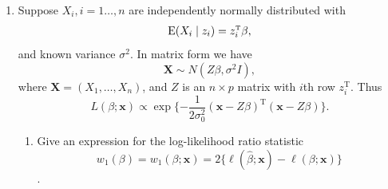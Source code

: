 \documentclass[12pt]{article}
\def\E{{\rm E}}
\def\T{{ \mathrm{\scriptscriptstyle T} }}
\def\bs#1{{\boldsymbol{#1}}}
\begin{document}
\begin{enumerate}
\textcolor{red}{Rewrite 
\small
\begin{align*}
    R_\theta(\hat\theta) &= \sum_{i=1}^n E\left[\left(X_i - \theta_i - b \frac{X_i}{\sum_{j=1}^n X_j^2}\right)^2\right]\\
    &= \sum_{i=1}^n E((X_i - \theta_i)^2) - 2b \sum_{i=1}^n E\left[(X_i - \theta_j ) \frac{X_i}{\sum_{j=1}^n X_j^2}\right] + b^2 \sum_{i=1}^n E\left(\frac{X_i^2}{(\sum_{j=1}^n X_j^2)^2}\right)
\end{align*}
\normalsize
Let $g(X_i) = \frac{X_i}{\sum_{j=1}^n X_j^2}$. Since $X_i \sim \mathcal N(0, 1)$, $g$ is absolutely continuous, then by Stein's identity, 
\begin{equation*}
    E((X_i - \theta_i)g(X_i)) = E(g'(X_i)) = E\left[\frac{1}{\sum_{j=1}^n X_j^2} - \frac{2X_i^2}{\left(\sum_{j=1}^n X_j^2\right)^2}\right]
\end{equation*}
thus 
\begin{equation*}
    R_\theta(\hat\theta) = n - 2b n E\left(\frac{1}{\sum_{j=1}^n X_j^2}\right) + (b^2 + 4b) E\left(\frac{1}{\sum_{j=1}^n X_j^2}\right)
\end{equation*}
so 
\begin{align*}
    \frac{\partial R_\theta}{\partial b} &= (2b + 4) E\left(\frac{1}{\sum_{j=1}^n X_j^2}\right)- 2n E\left(\frac{1}{\sum_{j=1}^n X_j^2}\right)\\
    &= (2b + 4 - 2n)E\left(\frac{1}{\sum_{j=1}^n X_j^2}\right) \\
    &= 0 \text{ if $b = n-2$}
\end{align*}
Taking the second derivative, 
\begin{equation*}
    \frac{\partial ^2 R_\theta}{\partial b^2} = 2E\left(\frac{1}{\sum_{j=1}^n X_j^2}\right) 
\end{equation*}
which is greater than 0 at $b = n-2$, thus $R_\theta$ is minimized in $b$ at $b = n-2$. 
}
\item Suppose $X_i, i = 1 \dots, n$ are independently normally distributed with $$\E(X_i\mid z_i) = z_i^\T\beta,$$ and known variance $\sigma^2$. In matrix form we have $$\bs X \sim N(Z\beta, \sigma^2 I),$$ where $\bs X = (X_1, \dots, X_n)$, and $Z$ is an $n \times p$ matrix with $i$th row $z_i^\T$. Thus $$L(\beta; \bs x) \propto  \exp\{-\frac{1}{2\sigma_0^2}(\bs x - Z \beta)^\T(\bs x - Z\beta)\}.$$\begin{enumerate}
 \item 	 Give an expression for the log-likelihood ratio statistic 
$$w_1(\beta) = w_1(\beta;\bs x) = 2\{\ell(\hat\beta;\bs{x})-\ell(\beta; \bs{x})\}$$.

\end{enumerate}
\end{enumerate}
\end{document}
